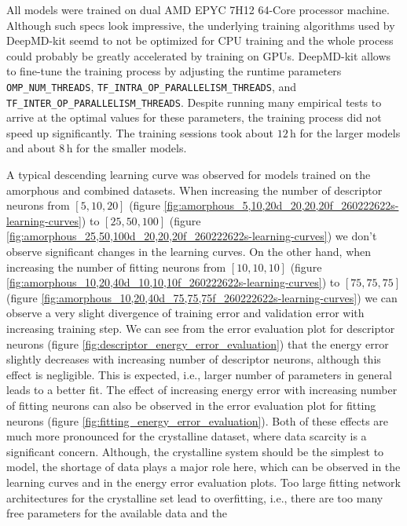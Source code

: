 All models were trained on dual AMD EPYC 7H12 64-Core processor machine.
Although such specs look impressive, the underlying training algorithms used
by DeepMD-kit seemd to not be optimized for CPU training and the whole process
could probably be greatly accelerated by training on GPUs. DeepMD-kit allows
to fine-tune the training process by adjusting the runtime parameters
\texttt{OMP\_NUM\_THREADS}, \texttt{TF\_INTRA\_OP\_PARALLELISM\_THREADS},
\linebreak and \texttt{TF\_INTER\_OP\_PARALLELISM\_THREADS}. Despite running
many empirical tests to arrive at the optimal values for these parameters, the
training process did not speed up significantly. The training sessions took
about $12 \, \mathrm{h}$ for the larger models and about $8 \, \mathrm{h}$ for
the smaller models.

A typical descending learning curve was observed for models trained on the
amorphous and combined datasets. When increasing the number of descriptor
neurons from $[5, 10, 20]$ (figure
\ref{fig:amorphous_5,10,20d_20,20,20f_260222622s-learning-curves}) to
$[25, 50, 100]$ (figure
\ref{fig:amorphous_25,50,100d_20,20,20f_260222622s-learning-curves}) we don't
observe significant changes in the learning curves. On the other hand, when
increasing the number of fitting neurons from $[10, 10, 10]$
(figure \ref{fig:amorphous_10,20,40d_10,10,10f_260222622s-learning-curves}) to
$[75, 75, 75]$ (figure
\ref{fig:amorphous_10,20,40d_75,75,75f_260222622s-learning-curves}) we can
observe a very slight divergence of training error and validation error with
increasing training step. We can see from the error evaluation plot for
descriptor neurons (figure \ref{fig:descriptor_energy_error_evaluation}) that
the energy error slightly decreases with increasing number of descriptor
neurons, although this effect is negligible. This is expected, i.e., larger
number of parameters in general leads to a better fit. The effect of
increasing energy error with increasing number of fitting neurons can also be
observed in the error evaluation plot for fitting neurons (figure
\ref{fig:fitting_energy_error_evaluation}). Both of these effects are much
more pronounced for the crystalline dataset, where data scarcity is a
significant concern. Although, the crystalline system should be the simplest
to model, the shortage of data plays a major role here, which can be observed
in the learning curves and in the energy error evaluation plots. Too large
fitting network architectures for the crystalline set lead to overfitting,
i.e., there are too many free parameters for the available data and the
